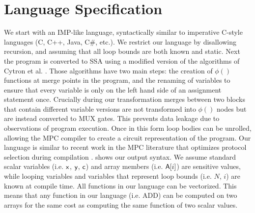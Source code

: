 \section{Language Specification}
\label{sec:language}

We start with an IMP-like \cite{Nipkow2014} language, syntactically similar to imperative
C-style languages (C, C++, Java, C\#, etc.). %
We restrict our language by disallowing recursion, and assuming that all loop bounds are both known and static. 
Next the program is converted to SSA using a modified version of the algorithms of 
Cytron et al. \cite{Cytron1991}. Those algorithms have two main steps: the creation
of $\phi()$ functions at merge points in the program, and the renaming of variables
to ensure that every variable is only on the left hand side of an assignment statement once.
Crucially during our transformation merges between two blocks that contain different variable
versions are not transformed into $\phi()$ nodes but are instead converted to MUX gates. This
prevents data leakage due to observations of program execution. Once in this form loop 
bodies can be unrolled, allowing the MPC compiler to create a circuit 
representation of the program. Our language is similar to recent work
in the MPC literature that optimizes protocol selection during 
compilation \cite{Ishaq2019}.  shows our output syntax. 
We assume standard scalar variables (i.e. ${\sf {x}}$, ${\sf y}$, ${\sf c}$) and array members (i.e. ${{\sf A}[i]}$) are sensitive 
values, while looping variables and variables that represent loop bounds (i.e. $N$, $i$) are known at compile time.
All functions in our language can be vectorized. This means that any function in our language 
(i.e. ADD) can be computed on two arrays for the same cost as computing the same 
function of two scalar values.



